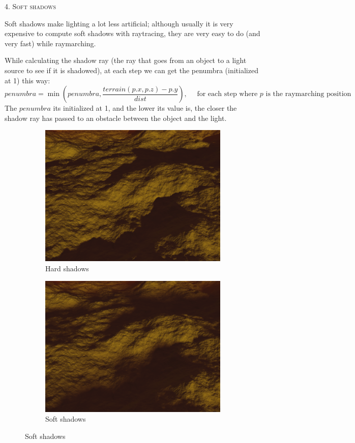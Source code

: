 \documentclass[a4paper,10pt]{article} %
\newcommand{\tsection}[1]{%
    {\center \bigbreak \par \hfil \huge \textsc {#1}} \bigbreak \par}
\begin{document}
\newpage

\tsection{4. Soft shadows}
Soft shadows make lighting a lot less artificial; although usually it is very
expensive to compute soft shadows with raytracing, they are very easy to do
(and very fast) while raymarching. 

While calculating the shadow ray (the ray that goes from an object to a light source to see if it is shadowed), at each step we can get the 
penumbra (initialized at 1) this way:
\[
    penumbra = \min(penumbra, \frac{terrain(p.x, p.z) - p.y}{dist}), \quad \text{ for each step where $p$ is the raymarching position}
\]
The $penumbra$ its initialized at 1, and the lower its value is, the closer the shadow ray has passed to an obstacle between the object and the light.

\begin{figure}[ht]
  \centering
  \begin{subfigure}[h]{0.5\linewidth}
    \includegraphics[width=0.95\linewidth]{hardshadows}
    \caption{Hard shadows}
  \end{subfigure}%
  \begin{subfigure}[h]{0.5\linewidth}
    \includegraphics[width=0.95\linewidth]{softshadows}
    \caption{Soft shadows}
  \end{subfigure}
\end{figure}
\end{document}
